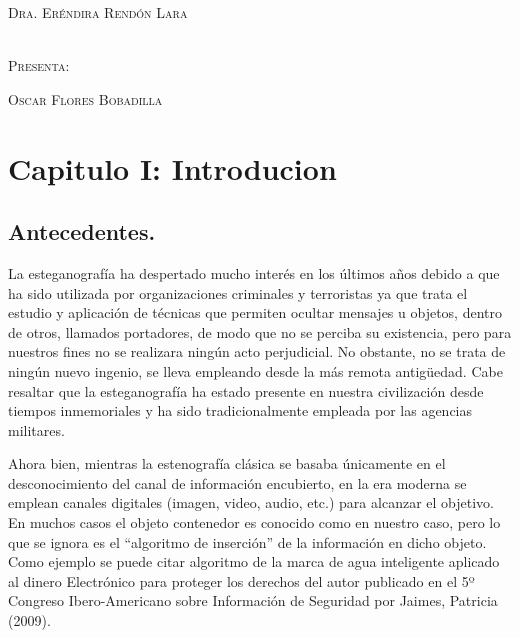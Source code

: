 \documentclass[12pt]{article}
\begin{document}
\begin{center}
\begin{Huge}
\textsc{\Large Dra. Eréndira Rendón Lara} \ \\ \ \\  %
\end{Huge}
\end{center}

\begin{center}
\begin{Huge}
\textsc{\Large Presenta:}
\end{Huge}
\end{center}

\begin{center}
\begin{Huge}
\textsc{\Large Oscar Flores Bobadilla}
\end{Huge}
\end{center}

\maketitle
\newpage

\tableofcontents
\newpage
\listoffigures
\newpage
\section{Capitulo I: Introducion}
\subsection{Antecedentes.}
La esteganografía ha despertado mucho interés en los últimos años debido a que ha sido utilizada por organizaciones criminales y terroristas  ya  que trata el estudio y aplicación de técnicas que permiten ocultar mensajes u objetos, dentro de otros, llamados portadores, de modo que no se perciba su existencia, pero para nuestros fines no se realizara ningún acto perjudicial. No obstante, no se trata de ningún nuevo ingenio, se lleva empleando desde la más remota antigüedad. Cabe resaltar que la esteganografía ha estado presente en nuestra civilización desde tiempos inmemoriales y ha sido tradicionalmente empleada por las agencias militares.

Ahora bien, mientras la estenografía clásica se basaba únicamente en el desconocimiento del canal de información encubierto, en la era moderna se emplean canales digitales (imagen, video, audio, etc.) para alcanzar el objetivo. En muchos casos el objeto contenedor es conocido como en nuestro caso, pero lo que se ignora es el “algoritmo de inserción” de la información en dicho objeto. Como ejemplo se puede citar algoritmo de la marca de agua inteligente aplicado al dinero Electrónico para proteger los derechos del autor publicado en el 5º Congreso Ibero-Americano sobre Información de Seguridad por Jaimes, Patricia (2009).\cite{Jaimes}
\end{document}
